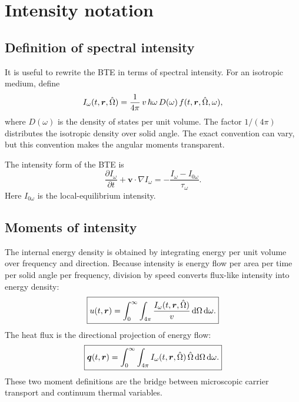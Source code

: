 \documentclass[11pt]{article}
\begin{document}
\section{Intensity notation}
\subsection{Definition of spectral intensity}
It is useful to rewrite the BTE in terms of spectral intensity. For an isotropic medium, define
\begin{equation}
    I_\omega(t,\bm{r},\hat{\Omega})
    =\frac{1}{4\pi}\,v\,\hbar\omega\,D(\omega)\,f(t,\bm{r},\hat{\Omega},\omega),
    \label{eq:intensity_definition}
\end{equation}
where \(D(\omega)\) is the density of states per unit volume. The factor \(1/(4\pi)\) distributes the isotropic density over solid angle. The exact convention can vary, but this convention makes the angular moments transparent.

The intensity form of the BTE is
\begin{equation}
    \boxed{\frac{\partial I_\omega}{\partial t}+\bm{v}\cdot\nabla I_\omega
    =-\frac{I_\omega-I_{0\omega}}{\tau_\omega}.}
    \label{eq:intensity_bte}
\end{equation}
Here \(I_{0\omega}\) is the local-equilibrium intensity.

\subsection{Moments of intensity}
The internal energy density is obtained by integrating energy per unit volume over frequency and direction. Because intensity is energy flow per area per time per solid angle per frequency, division by speed converts flux-like intensity into energy density:
\begin{equation}
    \boxed{u(t,\bm{r})=\int_0^\infty\int_{4\pi}\frac{I_\omega(t,\bm{r},\hat{\Omega})}{v}\,\dd\Omega\,\dd\omega.}
    \label{eq:energy_moment}
\end{equation}
The heat flux is the directional projection of energy flow:
\begin{equation}
    \boxed{\bm{q}(t,\bm{r})=\int_0^\infty\int_{4\pi} I_\omega(t,\bm{r},\hat{\Omega})\,\hat{\Omega}\,\dd\Omega\,\dd\omega.}
    \label{eq:flux_moment}
\end{equation}
These two moment definitions are the bridge between microscopic carrier transport and continuum thermal variables.
\end{document}
